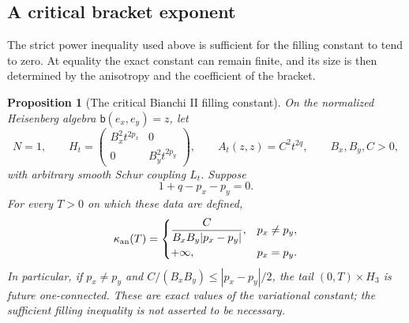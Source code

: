 \documentclass[10pt,a4paper]{article}
\numberwithin{equation}{section}
\newtheorem{proposition}[theorem]{Proposition}
\theoremstyle{definition}
\theoremstyle{remark}
\begin{document}
\subsection{A critical bracket exponent}
The strict power inequality used above is sufficient for the filling
constant to tend to zero.  At equality the exact constant can remain
finite, and its size is then determined by the anisotropy and the
coefficient of the bracket.

\begin{proposition}[The critical Bianchi II filling constant]
\label{prop:critical-bianchi-filling}
On the normalized Heisenberg algebra $\mathsf b(e_x,e_y)=z$, let
\[
 N=1,\qquad
 H_t=\begin{pmatrix}B_x^2t^{2p_x}&0\\0&B_y^2t^{2p_y}\end{pmatrix},
 \qquad A_t(z,z)=C^2t^{2q},\qquad B_x,B_y,C>0,
\]
with arbitrary smooth Schur coupling $L_t$.  Suppose
\[
 1+q-p_x-p_y=0.
\]
For every $T>0$ on which these data are defined,
\[
 \kappa_{\rm an}(T)=
 \begin{cases}
 \displaystyle\frac{C}{B_xB_y|p_x-p_y|},&p_x\ne p_y,\\[6pt]
 +\infty,&p_x=p_y.
 \end{cases}
\]
In particular, if $p_x\ne p_y$ and
$C/(B_xB_y)\le|p_x-p_y|/2$, the tail $(0,T)\times H_3$ is future
one-connected.  These are exact values of the variational constant;
the sufficient filling inequality is not asserted to be necessary.
\end{proposition}
\end{document}
